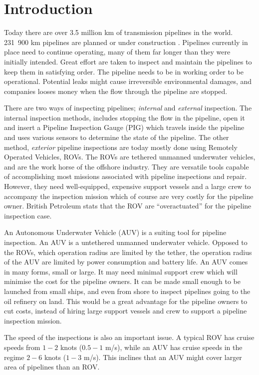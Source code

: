 \chapter{Introduction}
	Today there are over 3.5 million km of transmission pipelines in the world. 231~900 km pipelines
	are planned or under construction \cite{DNV_pipelines}. Pipelines currently in place need to
	continue operating, many of them far longer than they were initially intended. Great effort are taken
	to inspect and maintain the pipelines to keep them in satisfying order.  The pipeline needs to be 
	in working order to be operational.
	Potential leaks might cause irreversible environmental damages, and companies looses money when the
	flow through the pipeline are stopped. 

	There are two ways of inspecting pipelines; \textit{internal} and \textit{external} 
	inspection. The internal inspection methods, includes stopping the flow in the pipeline,
	open it and insert a Pipeline Inspection Gauge (PIG) which travels inside the pipeline and uses various
	sensors to determine the state of the pipeline. The other method, \textit{exterior} pipeline
	inspections are today mostly done using Remotely Operated Vehicles, ROVs. The ROVs are tethered
	unmanned underwater vehicles, and are the work horse of the offshore industry. They are versatile
	tools capable of accomplishing most missions associated with pipeline inspections and repair. However,
	they need well-equipped, expensive support vessels and a large crew to accompany the inspection
	mission which of course are very costly for the pipeline owner. British Petroleum stats that the ROV
	are ``overactuated'' for the pipeline inspection case.\cite{pipelines}

	An Autonomous Underwater Vehicle (AUV) is a suiting tool for pipeline inspection. An AUV is a
	untethered unmanned underwater vehicle. Opposed to the ROVs, which operation radius are limited by the
	tether, the operation radius of the AUV are limited by power consumption and battery life. 
	An AUV comes in many forms, small or large. It may need minimal support crew which will minimise the
	cost for the pipeline owners. It can be made small enough to be launched from small ships, and even
	from shore to inspect pipelines going to the oil refinery on land. This would be a great advantage
	for the pipeline owners to cut costs, instead of hiring large support vessels and crew to support a
	pipeline inspection mission.
	
	The speed of the inspections is also an important issue. A typical ROV has cruise speeds from $1-2$
	knots ($0.5-1$ m/s), while an AUV has cruise speeds in the regime $2-6$ knots ($1-3$ m/s). This
	inclines that an AUV might cover larger area of pipelines than an ROV. 


